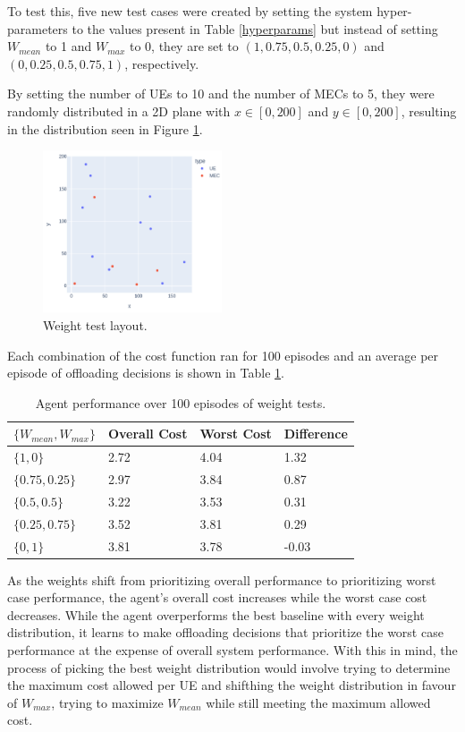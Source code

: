 To test this, five new test cases were created by setting the system hyper-parameters to the values present in Table \ref{hyperparams} but instead of setting $W_{mean}$ to 1 and $W_{max}$ to 0, they are set to $(1, 0.75, 0.5, 0.25, 0)$ and $(0, 0.25, 0.5, 0.75, 1)$, respectively.

By setting the number of \acrshort{UE}s to 10 and the number of \acrshort{MEC}s to 5, they were randomly distributed in a 2D plane with $x \in [0, 200]$ and $y \in [0, 200]$, resulting in the distribution seen in Figure \ref{weight_test}.

\begin{figure}[H]
  \centering
  \includegraphics[width=200px]{images/5_10_layout.png}
  \caption{Weight test layout.}  \label{weight_test}
\end{figure}

Each combination of the cost function ran for 100 episodes and an average per episode of offloading decisions is shown in Table \ref{weight_table}.

\begin{table}[H]
\centering
\begin{tabular}{|l|l|l|l|}
\hline
$\{W_{mean}, W_{max}\}$ & Overall Cost & Worst Cost & Difference \\ \hline
$\{1, 0\}$       & 2.72 & 4.04 & 1.32\\
$\{0.75, 0.25\}$  & 2.97 & 3.84  & 0.87\\
$\{0.5, 0.5\}$ & 3.22 & 3.53 & 0.31\\ 
$\{0.25, 0.75\}$ & 3.52 & 3.81 & 0.29\\ 
$\{0, 1\}$ & 3.81 & 3.78 & -0.03 \\ \hline
\end{tabular}
\caption{Agent performance over 100 episodes of weight tests.} \label{weight_table}
\end{table}

As the weights shift from prioritizing overall performance to prioritizing worst case performance, the agent's overall cost increases while the worst case cost decreases. While the agent overperforms the best baseline with every weight distribution, it learns to make offloading decisions that prioritize the worst case performance at the expense of overall system performance. With this in mind, the process of picking the best weight distribution would involve trying to determine the maximum cost allowed per \acrshort{UE} and shifthing the weight distribution in favour of $W_{max}$, trying to maximize $W_{mean}$ while still meeting the maximum allowed cost.
